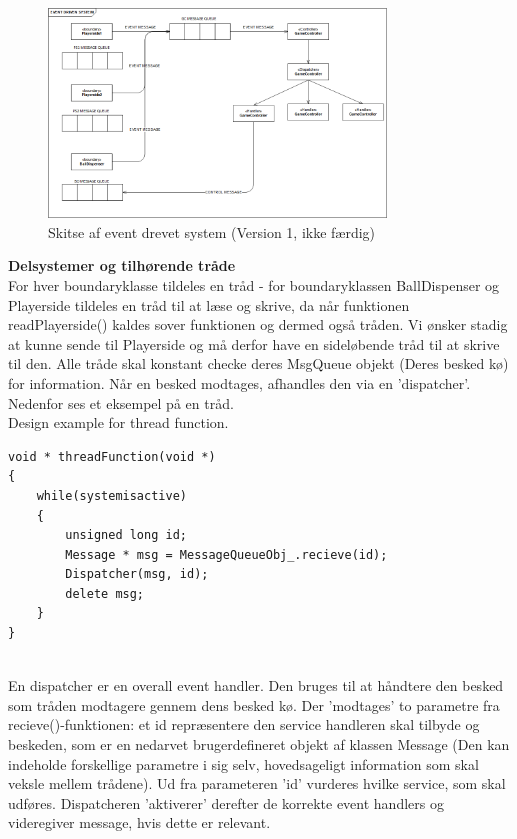 \documentclass[Softwaredesign/Softwaredesign_main.tex]{subfiles}
\begin{document}
\begin{figure}[H]
    \centering
    \includegraphics[width=0.8\textwidth]{Softwaredesign/RPiApp/graphic_RPi/EDS.png}
    \caption{Skitse af event drevet system (Version 1, ikke færdig)}
    \label{fig:EDS}
\end{figure}

\textbf{Delsystemer og tilhørende tråde}
\\For hver boundaryklasse tildeles en tråd - for boundaryklassen BallDispenser og Playerside tildeles en tråd til at læse og skrive, da når funktionen readPlayerside() kaldes sover funktionen og dermed også tråden. Vi ønsker stadig at kunne sende til Playerside og må derfor have en sideløbende tråd til at skrive til den. Alle tråde skal konstant checke deres MsgQueue objekt (Deres besked kø) for information. Når en besked modtages, afhandles den via en 'dispatcher'. Nedenfor ses et eksempel på en tråd.
\\Design example for thread function. 
\begin{lstlisting}
void * threadFunction(void *)
{
    while(systemisactive)
    {
        unsigned long id;
        Message * msg = MessageQueueObj_.recieve(id);
        Dispatcher(msg, id);
        delete msg; 
    }
}
\end{lstlisting}


\\En dispatcher er en overall event handler. Den bruges til at håndtere den besked som tråden modtagere gennem dens besked kø. Der 'modtages' to parametre fra recieve()-funktionen: et id repræsentere den service handleren skal tilbyde og beskeden, som er en nedarvet brugerdefineret objekt af klassen Message (Den kan indeholde forskellige parametre i sig selv, hovedsageligt information som skal veksle mellem trådene). Ud fra parameteren 'id' vurderes hvilke service, som skal udføres. Dispatcheren 'aktiverer' derefter de korrekte event handlers og videregiver message, hvis dette er relevant. 
\end{document}
